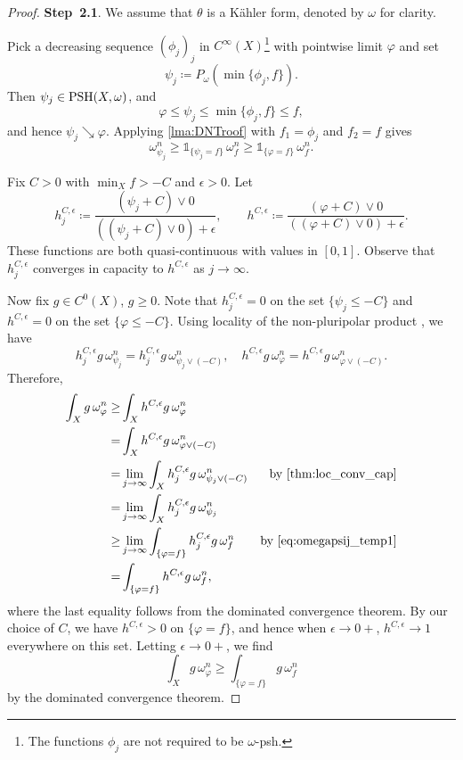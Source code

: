 \begin{proof}
\textbf{Step~2.1}. We assume that $\theta$ is a Kähler form, denoted by $\omega$ for clarity.

Pick a decreasing sequence $(\phi_j)_j$ in $C^{\infty}(X)$\footnote{The functions $\phi_j$ are not required to be $\omega$-psh.} with pointwise limit $\varphi$ and set
\[
\psi_j\coloneqq P_{\omega}\left(\min\{\phi_j,f\}\right).
\]
Then $\psi_j\in\mathrm{PSH}(X,\omega)$, and
\[
\varphi\leq\psi_j\leq\min\{\phi_j,f\} \leq f,
\]
and hence $\psi_j\searrow\varphi$.
Applying \cref{lma:DNTroof} with $f_1=\phi_j$ and $f_2=f$ gives
\begin{equation}\label{eq:omegapsij_temp1}
\omega^n_{\psi_j}\geq \mathds{1}_{\{\psi_j=f\}}\,\omega^n_f \geq \mathds{1}_{\{\varphi=f\}}\,\omega^n_f.
\end{equation}


Fix $C>0$ with $\min_X f>-C$ and $\epsilon>0$.
Let
\[
h_j^{C,\epsilon}\coloneqq \frac{(\psi_j+C)\lor 0}{\left((\psi_j+C)\lor 0 \right)+\epsilon},\qquad h^{C,\epsilon}\coloneqq \frac{(\varphi+C)\lor 0}{\left((\varphi+C)\lor 0\right)+\epsilon}.
\]
These functions are both quasi-continuous with values in $[0,1]$.
Observe that $h_j^{C,\epsilon}$ converges in capacity to $h^{C,\epsilon}$ as $j\to\infty$.


Now fix $g\in C^0(X)$, $g\geq 0$. Note that $h_j^{C,\epsilon}=0$ on the set $\{\psi_j\leq -C\}$ and $h^{C,\epsilon}=0$ on the set $\{\varphi\leq -C\}$.
Using locality of the non-pluripolar product , we have
\[
h_j^{C,\epsilon}g \,\omega_{\psi_j}^n=h_j^{C,\epsilon}g \,\omega_{\psi_j\lor (-C)}^n,\quad h^{C,\epsilon}g \,\omega_{\varphi}^n=h^{C,\epsilon}g \,\omega_{\varphi\lor (-C)}^n.
\]
Therefore,
\[
\begin{aligned}
\int_X g\,\omega_{\varphi}^n\geq & \int_X h^{C,\epsilon}g \,\omega_{\varphi}^n & \\
=& \int_X h^{C,\epsilon}g \,\omega_{\varphi\lor (-C)}^n &\\
=& \lim_{j\to\infty} \int_X h_j^{C,\epsilon}g \,\omega_{\psi_j\lor (-C)}^n & \textup{by \cref{thm:loc_conv_cap}}\\
=&\lim_{j\to\infty} \int_X h_j^{C,\epsilon}g \,\omega_{\psi_j}^n &\\
\geq & \lim_{j\to\infty} \int_{\{\varphi=f\}} h_j^{C,\epsilon}g \,\omega_{f}^n & \textup{by }\eqref{eq:omegapsij_temp1}\\
=& \int_{\{\varphi=f\}}h^{C,\epsilon}g \,\omega_{f}^n,
\end{aligned}
\]
where the last equality follows from the dominated convergence theorem.
By our choice of $C$, we have $h^{C,\epsilon}>0$ on $\{\varphi=f\}$, and hence when $\epsilon\to 0+$, $h^{C,\epsilon}\to 1$ everywhere on this set. Letting $\epsilon\to 0+$, we find
\[
\int_X g\,\omega_{\varphi}^n\geq \int_{\{\varphi=f\}}g \,\omega_{f}^n
\]
by the dominated convergence theorem.


\end{proof}
